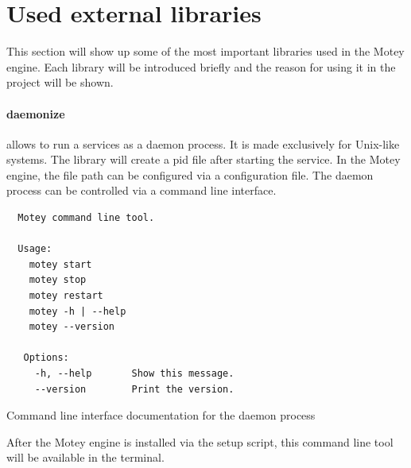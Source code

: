 \section{Used external libraries}
This section will show up some of the most important libraries used in the Motey engine.
Each library will be introduced briefly and the reason for using it in the project will be shown.

\paragraph{daemonize}\label{library:daemonize} allows to run a services as a daemon process.
It is made exclusively for Unix-like systems.
The library will create a pid file after starting the service.
In the Motey engine, the file path can be configured via a configuration file.
The daemon process can be controlled via a command line interface.
\begin{listing}[H]
  \begin{verbatim}
  Motey command line tool.

  Usage:
    motey start
    motey stop
    motey restart
    motey -h | --help
    motey --version

   Options:
     -h, --help       Show this message.
     --version        Print the version.
  \end{verbatim}
  \caption{Command line interface documentation for the daemon process}
  \label{code:cli-tool}
\end{listing}
After the Motey engine is installed via the setup script, this command line tool will be available in the terminal.

